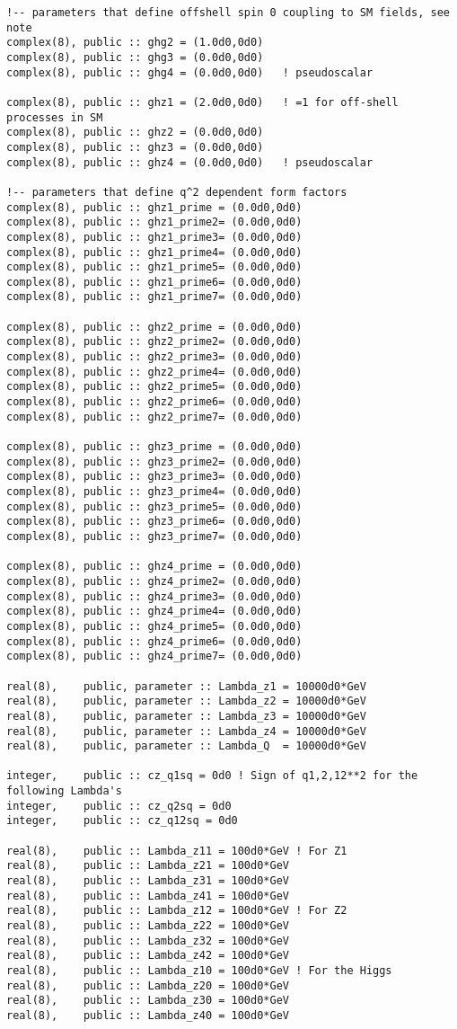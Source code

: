 \documentclass[aps,superscriptaddress,nofootinbib]{revtex4}
\begin{document}
\begin{verbatim}
!-- parameters that define offshell spin 0 coupling to SM fields, see note
complex(8), public :: ghg2 = (1.0d0,0d0)
complex(8), public :: ghg3 = (0.0d0,0d0)
complex(8), public :: ghg4 = (0.0d0,0d0)   ! pseudoscalar

complex(8), public :: ghz1 = (2.0d0,0d0)   ! =1 for off-shell processes in SM
complex(8), public :: ghz2 = (0.0d0,0d0)
complex(8), public :: ghz3 = (0.0d0,0d0)
complex(8), public :: ghz4 = (0.0d0,0d0)   ! pseudoscalar

!-- parameters that define q^2 dependent form factors
complex(8), public :: ghz1_prime = (0.0d0,0d0)
complex(8), public :: ghz1_prime2= (0.0d0,0d0)
complex(8), public :: ghz1_prime3= (0.0d0,0d0)
complex(8), public :: ghz1_prime4= (0.0d0,0d0)
complex(8), public :: ghz1_prime5= (0.0d0,0d0)
complex(8), public :: ghz1_prime6= (0.0d0,0d0)
complex(8), public :: ghz1_prime7= (0.0d0,0d0)

complex(8), public :: ghz2_prime = (0.0d0,0d0)
complex(8), public :: ghz2_prime2= (0.0d0,0d0)
complex(8), public :: ghz2_prime3= (0.0d0,0d0)
complex(8), public :: ghz2_prime4= (0.0d0,0d0)
complex(8), public :: ghz2_prime5= (0.0d0,0d0)
complex(8), public :: ghz2_prime6= (0.0d0,0d0)
complex(8), public :: ghz2_prime7= (0.0d0,0d0)

complex(8), public :: ghz3_prime = (0.0d0,0d0)
complex(8), public :: ghz3_prime2= (0.0d0,0d0)
complex(8), public :: ghz3_prime3= (0.0d0,0d0)
complex(8), public :: ghz3_prime4= (0.0d0,0d0)
complex(8), public :: ghz3_prime5= (0.0d0,0d0)
complex(8), public :: ghz3_prime6= (0.0d0,0d0)
complex(8), public :: ghz3_prime7= (0.0d0,0d0)

complex(8), public :: ghz4_prime = (0.0d0,0d0)
complex(8), public :: ghz4_prime2= (0.0d0,0d0)
complex(8), public :: ghz4_prime3= (0.0d0,0d0)
complex(8), public :: ghz4_prime4= (0.0d0,0d0)
complex(8), public :: ghz4_prime5= (0.0d0,0d0)
complex(8), public :: ghz4_prime6= (0.0d0,0d0)
complex(8), public :: ghz4_prime7= (0.0d0,0d0)

real(8),    public, parameter :: Lambda_z1 = 10000d0*GeV
real(8),    public, parameter :: Lambda_z2 = 10000d0*GeV
real(8),    public, parameter :: Lambda_z3 = 10000d0*GeV
real(8),    public, parameter :: Lambda_z4 = 10000d0*GeV
real(8),    public, parameter :: Lambda_Q  = 10000d0*GeV

integer,    public :: cz_q1sq = 0d0 ! Sign of q1,2,12**2 for the following Lambda's
integer,    public :: cz_q2sq = 0d0
integer,    public :: cz_q12sq = 0d0

real(8),    public :: Lambda_z11 = 100d0*GeV ! For Z1
real(8),    public :: Lambda_z21 = 100d0*GeV
real(8),    public :: Lambda_z31 = 100d0*GeV
real(8),    public :: Lambda_z41 = 100d0*GeV
real(8),    public :: Lambda_z12 = 100d0*GeV ! For Z2
real(8),    public :: Lambda_z22 = 100d0*GeV
real(8),    public :: Lambda_z32 = 100d0*GeV
real(8),    public :: Lambda_z42 = 100d0*GeV
real(8),    public :: Lambda_z10 = 100d0*GeV ! For the Higgs
real(8),    public :: Lambda_z20 = 100d0*GeV
real(8),    public :: Lambda_z30 = 100d0*GeV
real(8),    public :: Lambda_z40 = 100d0*GeV
\end{verbatim}
\end{document}
